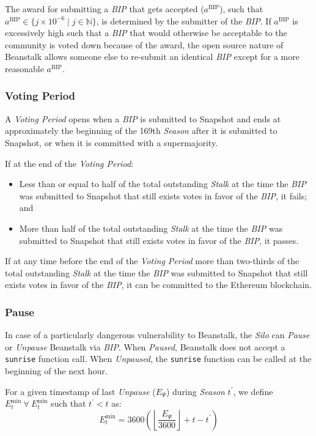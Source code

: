 \documentclass[tikz]{article}
\newcommand{\code}[1]{\texttt{#1}}
\newcommand{\term}[1]{\textsl{#1}}
\begin{document}
The award for submitting a \term{BIP} that gets accepted ($a^{\text{BIP}}$), such that $a^{\text{BIP}} \in \{j \times 10^{-6} \mid j \in \mathbb{N} \}$, is determined by the submitter of the \term{BIP}. If $a^{\text{BIP}}$ is excessively high such that a \term{BIP} that would otherwise be acceptable to the community is voted down because of the award, the open source nature of Beanstalk allows someone else to re-submit an identical \term{BIP} except for a more reasonable $a^{\text{BIP}}$.

\subsubsection{Voting Period}
\vspace*{-1mm}
A \term{Voting Period} opens when a \term{BIP} is submitted to Snapshot and ends at approximately the beginning of the 169th \term{Season} after it is submitted to Snapshot, or when it is committed with a supermajority.

If at the end of the \term{Voting Period}:
\begin{itemize}[midsep]
    \item Less than or equal to half of the total outstanding \term{Stalk} at the time the \term{BIP} was submitted to Snapshot that still exists votes in favor of the \term{BIP}, it fails; and
    \item More than half of the total outstanding \term{Stalk} at the time the \term{BIP} was submitted to Snapshot that still exists votes in favor of the \term{BIP}, it passes.
\end{itemize}

If at any time before the end of the \term{Voting Period} more than two-thirds of the total outstanding \term{Stalk} at the time the \term{BIP} was submitted to Snapshot that still exists votes in favor of the \term{BIP}, it can be committed to the Ethereum blockchain.

\subsubsection{Pause}
In case of a particularly dangerous vulnerability to Beanstalk, the \term{Silo} can \term{Pause} or \term{Unpause} Beanstalk via \term{BIP}. When \term{Paused}, Beanstalk does not accept a \code{sunrise} function call. When \term{Unpaused}, the \code{sunrise} function can be called at the beginning of the next hour.

For a given timestamp of last \term{Unpause} ($E_{\Psi}$) during \term{Season} $t^{'}$, we define $E_{t}^{\text{min}}\ \forall\ E_{t}^{\text{min}}$ such that $t^{'} < t$ as:
$$E_{t}^{\text{min}} = 3600{\left({\left\lfloor\frac{E_{\Psi}}{3600}\right\rfloor} + t - t^{'}\right)}$$
\end{document}

